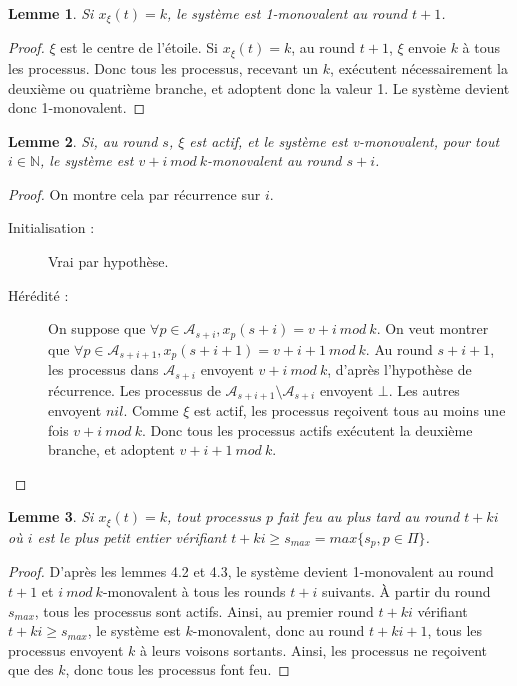 \documentclass{article}
\newtheorem{lemma}{Lemme}[section]
\begin{document}
\begin{lemma}
	Si $x_\xi(t) = k$, le système est 1-monovalent au round $t+1$.
\end{lemma}
\begin{proof}
	$\xi$ est le centre de l'étoile.
	Si $x_\xi(t) = k$, au round $t+1$, $\xi$ envoie $k$ à tous les processus. Donc tous les processus, recevant un $k$, exécutent nécessairement la deuxième ou quatrième branche,
	et adoptent donc la valeur 1. Le système devient donc 1-monovalent.
\end{proof}

\begin{lemma}
	Si, au round $s$, $\xi$ est actif, et le système est v-monovalent, pour tout $i \in \mathds{N}$, le système est $v+i~mod~k$-monovalent au round $s+i$.
\end{lemma}
\begin{proof}
	On montre cela par récurrence sur $i$.
	\begin{description}
		\item[Initialisation :] Vrai par hypothèse.
		\item[Hérédité :] On suppose que $\forall p \in \mathcal{A}_{s+i}, x_p(s+i) = v+i~mod~k$.
			On veut montrer que $\forall p \in \mathcal{A}_{s+i+1}, x_p(s+i+1) = v+i+1~mod~k$.
			Au round $s+i+1$, les processus dans $\mathcal{A}_{s+i}$ envoyent $v+i~mod~k$, d'après l'hypothèse de récurrence.
			Les processus de $\mathcal{A}_{s+i+1} \setminus \mathcal{A}_{s+i}$ envoyent $\bot$. Les autres envoyent $nil$.
			Comme $\xi$ est actif, les processus reçoivent tous au moins une fois $v+i~mod~k$. Donc tous les processus actifs exécutent la deuxième branche, et adoptent $v+i+1~mod~k$.
	\end{description}
\end{proof}

\begin{lemma}
	Si $x_\xi(t) = k$, tout processus $p$ fait feu au plus tard au round $t+k i$ où $i$ est le plus petit entier vérifiant $t+k i \geq s_{max} = max \{s_p, p \in \Pi\}$.
\end{lemma}
\begin{proof}
	D'après les lemmes 4.2 et 4.3, le système devient 1-monovalent au round $t+1$ et $i~mod~k$-monovalent à tous les rounds $t+i$ suivants.
	À partir du round $s_{max}$, tous les processus sont actifs.
	Ainsi, au premier round $t+k i$ vérifiant $t+k i \geq s_{max}$, le système est $k$-monovalent, donc au round $t+k i +1$, tous les processus envoyent $k$ à leurs voisons sortants.
	Ainsi, les processus ne reçoivent que des $k$, donc tous les processus font feu.
\end{proof}
\end{document}
